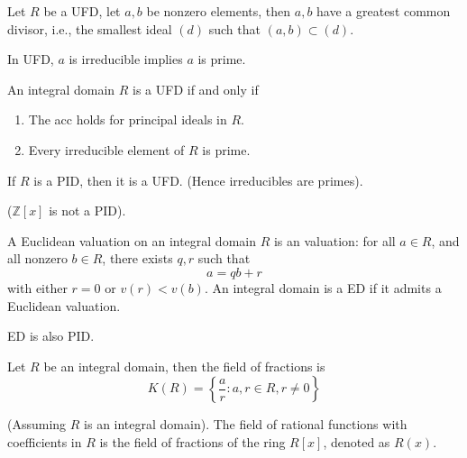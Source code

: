 \documentclass[openany]{book}
\newcommand{\Z}{\mathbb{Z}}
\begin{document}
\begin{prop}
    Let $R$ be a UFD, let $a,b$ be nonzero elements, then $a,b$ have a greatest common divisor, i.e., the smallest ideal $(d)$ such that $(a,b)\subset (d)$.
\end{prop}

\begin{prop}[*]
    In UFD, $a$ is irreducible implies $a$ is prime.
\end{prop}

\begin{thm}[*]
    An integral domain $R$ is a UFD if and only if 
    \begin{enumerate}
        \item The acc holds for principal ideals in $R$.
        \item Every irreducible element of $R$ is prime.
    \end{enumerate}
\end{thm}


\begin{prop}
    If $R$ is a PID, then it is a UFD. (Hence irreducibles are primes).

    ($\Z[x]$ is not a PID).
\end{prop}

\begin{defn}
    A Euclidean valuation on an integral domain $R$ is an valuation: for all $a\in R$, and all nonzero $b\in R$, there exists $q,r$ such that 
    \begin{equation*}
        a=qb+r
    \end{equation*}
    with either $r=0$ or $v(r)<v(b)$. An integral domain is a ED if it admits a Euclidean valuation.
\end{defn}

\begin{prop}
    ED is also PID.
\end{prop}


\begin{defn}
    Let $R$ be an integral domain, then the field of fractions is 
    \begin{equation*}
        K(R)=\left\{\frac{a}{r}: a,r\in R, r\neq 0\right\}
    \end{equation*}
\end{defn}


\begin{defn}
    (Assuming $R$ is an integral domain). The field of rational functions with coefficients in $R$ is the field of fractions of the ring $R[x]$, denoted as $R(x)$.
\end{defn}
\end{document}

